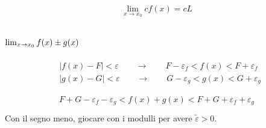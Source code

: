 \documentclass[letterpaper,10pt,italian]{jupyterBook}
\begin{document}
\begin{equation*}
\begin{split}
\begin{aligned}
\end{aligned}\end{split}
\end{equation*}\begin{equation*}
\begin{split}\begin{aligned}
 \lim_{x\rightarrow x_0} c f(x) = c L
\end{aligned}\end{split}
\end{equation*}\subsubsection*{\protect\(\lim_{x \rightarrow x_0} f(x) \pm g(x)\protect\)}
\begin{equation*}
\begin{split}\begin{aligned}
  & |f(x) - F| < \varepsilon \qquad \rightarrow \qquad F - \varepsilon_f < f(x) < F + \varepsilon_f \\
  & |g(x) - G| < \varepsilon \qquad \rightarrow \qquad G - \varepsilon_g < g(x) < G + \varepsilon_g \\
\end{aligned}\end{split}
\end{equation*}\begin{equation*}
\begin{split}\begin{aligned}
   F + G - \varepsilon_f - \varepsilon_g < f(x) + g(x)  < F + G + \varepsilon_f + \varepsilon_g \\
\end{aligned}\end{split}
\end{equation*}
\sphinxAtStartPar
Con il segno meno, giocare con i modulli per avere \(\tilde{\varepsilon} > 0\).
\end{document}
